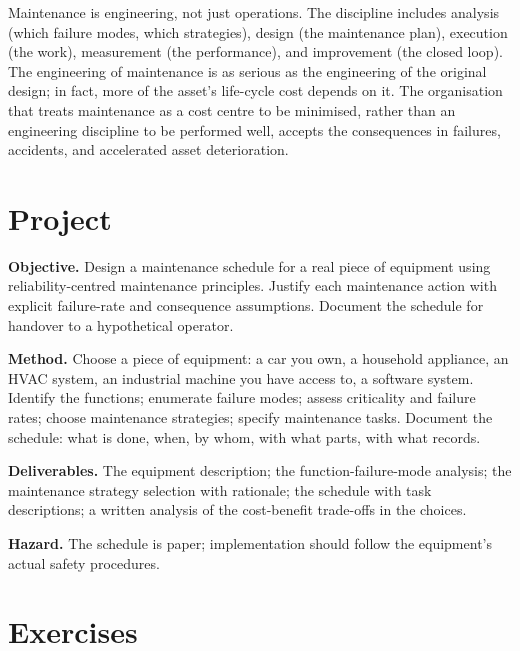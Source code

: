 \begin{principle}
Maintenance is engineering, not just operations. The discipline includes analysis (which failure modes, which strategies), design (the maintenance plan), execution (the work), measurement (the performance), and improvement (the closed loop). The engineering of maintenance is as serious as the engineering of the original design; in fact, more of the asset's life-cycle cost depends on it. The organisation that treats maintenance as a cost centre to be minimised, rather than an engineering discipline to be performed well, accepts the consequences in failures, accidents, and accelerated asset deterioration.
\end{principle}

\section{Project}

\begin{project}
\textbf{Objective.} Design a maintenance schedule for a real piece of equipment using reliability-centred maintenance principles. Justify each maintenance action with explicit failure-rate and consequence assumptions. Document the schedule for handover to a hypothetical operator.

\textbf{Method.} Choose a piece of equipment: a car you own, a household appliance, an HVAC system, an industrial machine you have access to, a software system. Identify the functions; enumerate failure modes; assess criticality and failure rates; choose maintenance strategies; specify maintenance tasks. Document the schedule: what is done, when, by whom, with what parts, with what records.

\textbf{Deliverables.} The equipment description; the function-failure-mode analysis; the maintenance strategy selection with rationale; the schedule with task descriptions; a written analysis of the cost-benefit trade-offs in the choices.

\textbf{Hazard.} The schedule is paper; implementation should follow the equipment's actual safety procedures.
\end{project}

\section{Exercises}

